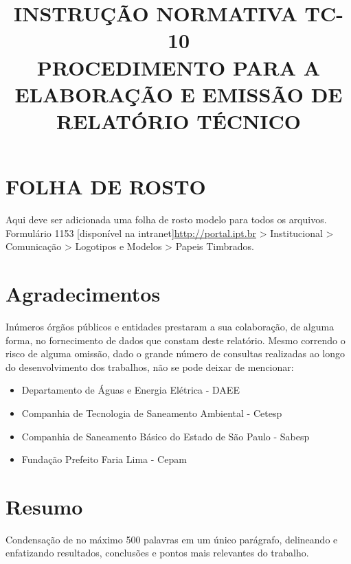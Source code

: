 \documentclass{article}
\begin{document}
\begin{titlepage}
\title{INSTRUÇÃO NORMATIVA TC-10 \\ PROCEDIMENTO PARA A ELABORAÇÃO E EMISSÃO DE RELATÓRIO TÉCNICO}
\maketitle
\end{titlepage}

\setcounter{page}{1}

\section*{FOLHA DE ROSTO}
Aqui deve ser adicionada uma folha de rosto modelo para todos os arquivos. Formulário 1153 [disponível na intranet]\url{http://portal.ipt.br} > Institucional > Comunicação > Logotipos e Modelos > Papeis Timbrados.
\newpage

\section*{Agradecimentos}
Inúmeros órgãos públicos e entidades prestaram a sua colaboração, de alguma forma, no fornecimento de dados que constam deste relatório. Mesmo correndo o risco de alguma omissão, dado o grande número de consultas realizadas ao longo do desenvolvimento dos trabalhos, não se pode deixar de mencionar:	
\begin{itemize}
    \item Departamento de Águas e Energia Elétrica - DAEE
    \item Companhia de Tecnologia de Saneamento Ambiental - Cetesp
    \item Companhia de Saneamento Básico do Estado de São Paulo - Sabesp
    \item Fundação Prefeito Faria Lima - Cepam
\end{itemize}
\newpage

\section*{Resumo}
Condensação de no máximo 500 palavras em um único parágrafo, delineando e enfatizando resultados, conclusões e pontos mais relevantes do trabalho.
\newpage

\tableofcontents
\newpage
\end{document}
